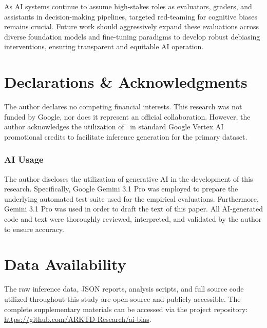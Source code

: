 \documentclass[12pt]{article}
\begin{document}
As AI systems continue to assume high-stakes roles as evaluators, graders, and assistants in decision-making pipelines, targeted red-teaming for cognitive biases remains crucial. Future work should aggressively expand these evaluations across diverse foundation models and fine-tuning paradigms to develop robust debiasing interventions, ensuring transparent and equitable AI operation.

\section*{Declarations \& Acknowledgments}
The author declares no competing financial interests. This research was not funded by Google, nor does it represent an official collaboration. However, the author acknowledges the utilization of \ in standard Google Vertex AI promotional credits to facilitate inference generation for the primary dataset.

\subsubsection*{AI Usage}
The author discloses the utilization of generative AI in the development of this research. Specifically, Google Gemini 3.1 Pro was employed to prepare the underlying automated test suite used for the empirical evaluations. Furthermore, Gemini 3.1 Pro was used in order to draft the text of this paper. All AI-generated code and text were thoroughly reviewed, interpreted, and validated by the author to ensure accuracy.


\section*{Data Availability}
The raw inference data, JSON reports, analysis scripts, and full source code utilized throughout this study are open-source and publicly accessible. The complete supplementary materials can be accessed via the project repository: \url{https://github.com/ARKTD-Research/ai-bias}.
\end{document}
